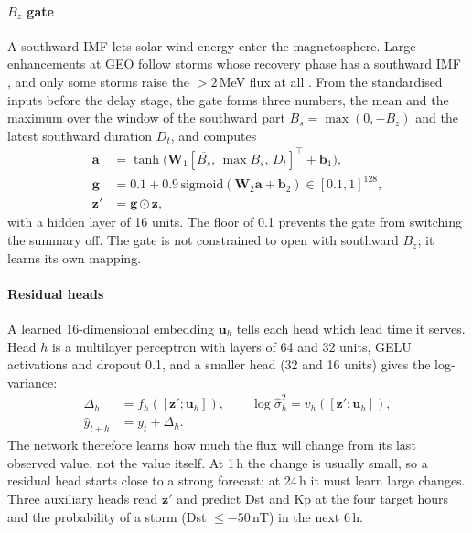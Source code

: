 \documentclass[a4paper,fleqn]{cas-dc}
\begin{document}
\paragraph{\(B_z\) gate} A southward IMF lets solar-wind energy enter the magnetosphere. Large enhancements at
GEO follow storms whose recovery phase has a southward IMF \citep{obara2000}, and only some storms raise the
\(>2\)\,MeV flux at all \citep{degtyarev2009}. From the standardised inputs before the delay stage, the gate forms three numbers, the
mean and the maximum over the window of the southward part \(B_s=\max(0,-B_z)\) and the latest southward duration
\(D_t\), and computes
\begin{equation}
\begin{aligned}
\mathbf a&=\tanh\big(\mathbf W_1[\overline{B_s},\,\max B_s,\,D_t]^{\top}+\mathbf b_1\big),\\
\mathbf g&=0.1+0.9\,\mathrm{sigmoid}(\mathbf W_2\mathbf a+\mathbf b_2)\in[0.1,1]^{128},\\
\mathbf z'&=\mathbf g\odot\mathbf z,
\end{aligned} \label{eq:gate}
\end{equation}
with a hidden layer of 16 units. The floor of 0.1 prevents the gate from switching the summary off. The gate is
not constrained to open with southward \(B_z\); it learns its own mapping.

\paragraph{Residual heads} A learned 16-dimensional embedding \(\mathbf u_h\) tells each head which lead time it
serves. Head \(h\) is a multilayer perceptron with layers of 64 and 32 units, GELU activations and dropout 0.1,
and a smaller head (32 and 16 units) gives the log-variance:
\begin{equation}
\begin{aligned}
\Delta_h&=f_h([\mathbf z';\mathbf u_h]),\qquad \log\hat\sigma^2_h=v_h([\mathbf z';\mathbf u_h]),\\
\hat y_{t+h}&=y_t+\Delta_h.
\end{aligned} \label{eq:heads}
\end{equation}
The network therefore learns how much the flux will change from its last observed value, not the value itself.
At 1\,h the change is usually small, so a residual head starts close to a strong forecast; at 24\,h it must learn
large changes. Three auxiliary heads read \(\mathbf z'\) and predict Dst and Kp at the four target hours and the
probability of a storm (Dst \(\le-50\)\,nT) in the next 6\,h.
\end{document}
